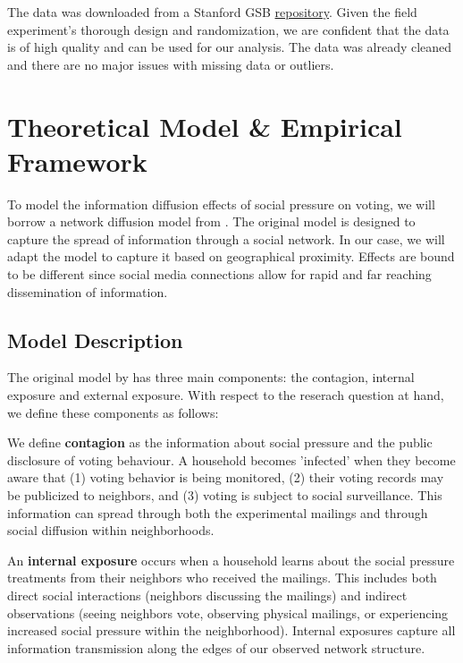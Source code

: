 \documentclass[11pt]{article}
\begin{document}
The data was downloaded from a Stanford GSB \href{https://github.com/gsbDBI/ExperimentData}{repository}. Given the field experiment's thorough design and randomization, we are confident that the data is of high quality and can be used for our analysis. The data was already cleaned and there are no major issues with missing data or outliers.


\pagebreak

\section{Theoretical Model \& Empirical Framework}
To model the information diffusion effects of social pressure on voting, we will borrow a network diffusion model from \cite{myers_information_2012}. The original model is designed to capture the spread of information through a social network. In our case, we will adapt the model to capture it based on geographical proximity. Effects are bound to be different since social media connections allow for rapid and far reaching dissemination of information.

\subsection{Model Description}
The original model by \cite{myers_information_2012} has three main components: the contagion, internal exposure and external exposure. With respect to the reserach question at hand, we define these components as follows:

We define \textbf{contagion} as the information about social pressure and the public disclosure of voting behaviour. A household becomes 'infected' when they become aware that (1) voting behavior is being monitored, (2) their voting records may be publicized to neighbors, and (3) voting is subject to social surveillance. This information can spread through both the experimental mailings and through social diffusion within neighborhoods.

An \textbf{internal exposure} occurs when a household learns about the social pressure treatments from their neighbors who received the mailings. This includes both direct social interactions (neighbors discussing the mailings) and indirect observations (seeing neighbors vote, observing physical mailings, or experiencing increased social pressure within the neighborhood). Internal exposures capture all information transmission along the edges of our observed network structure.
\end{document}
